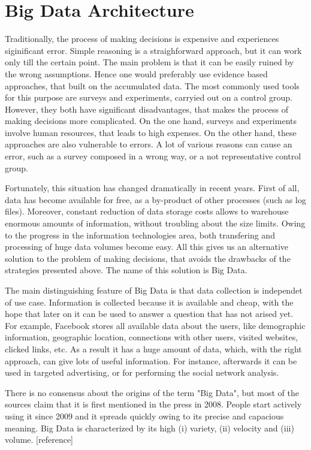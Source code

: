 \chapter{Big Data Architecture}
\label{chap:big_data_architecture}

Traditionally, the process of making decisions is expensive and experiences siginificant error.
Simple reasoning is a straighforward approach, but it can work only till the certain point.
The main problem is that it can be easily ruined by the wrong assumptions.
Hence one would preferably use evidence based approaches, that built on the accumulated data.
The most commonly used tools for this purpose are surveys and experiments, carryied out on a control group.   
However, they both have significant disadvantages, that makes the process of making decisions more complicated. 
On the one hand, surveys and experiments involve human resources, that leads to high expenses.
On the other hand, these approaches are also vulnerable to errors.
A lot of various reasons can cause an error, such as a survey composed in a wrong way, or a not representative control group.
 
Fortunately, this situation has changed dramatically in recent years.
First of all, data has become available for free, as a by-product of other processes (such as log files).
Moreover, constant reduction of data storage costs allows to warehouse enormous amounts of information, without troubling about the size limits.
Owing to the progress in the information technologies area, both transfering and processing of huge data volumes become easy.
All this gives us an alternative solution to the problem of making decisions, that avoids the drawbacks of the strategies presented above.
The name of this solution is Big Data.

The main distinguishing feature of Big Data is that data collection is independet of use case.
Information is collected because it is available and cheap, with the hope that later on it can be used to answer a question that has not arised yet.
For example, Facebook stores all available data about the users, like demographic information, geographic location, connections with other users, visited websites, clicked links, etc.
As a result it has a huge amount of data, which, with the right approach, can give lots of useful information. 
For instance, afterwards it can be used in targeted advertising, or for performing the social network analysis.

There is no consensus about the origins of the term "Big Data", but most of the sources claim that it is first mentioned in the press in 2008.
People start actively using it since 2009 and it spreads quickly owing to its precise and capacious meaning. 
Big Data is characterized by its high (i) variety, (ii) velocity and (iii) volume. [reference]

